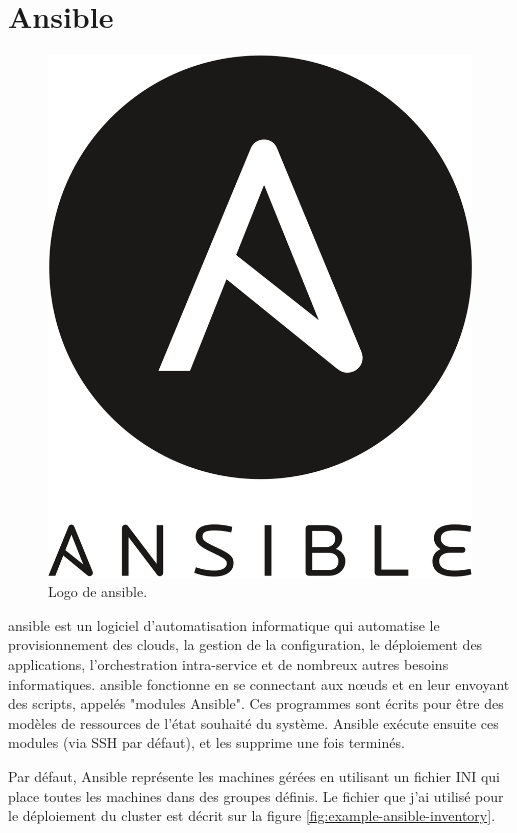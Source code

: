 \documentclass[12pt, french]{report}
\begin{document}
\section{Ansible}

\begin{figure}[h]
\includegraphics[scale=0.07]{assets/img/logo-ansible.png}
\centering
\caption{Logo de \gls{ansible}.}
\label{fig:logo-ansible}
\end{figure}

\gls{ansible} est un logiciel d'automatisation informatique qui automatise le provisionnement des clouds, la gestion de la configuration, le déploiement des applications, l'orchestration intra-service et de nombreux autres besoins informatiques. \gls{ansible} fonctionne en se connectant aux nœuds et en leur envoyant des scripts, appelés "modules Ansible". Ces programmes sont écrits pour être des modèles de ressources de l'état souhaité du système. Ansible exécute ensuite ces modules (via SSH par défaut), et les supprime une fois terminés.

Par défaut, Ansible représente les machines gérées en utilisant un fichier INI qui place toutes les machines dans des groupes définis. Le fichier que j'ai utilisé pour le déploiement du cluster est décrit sur la figure \ref{fig:example-ansible-inventory}.
\end{document}
